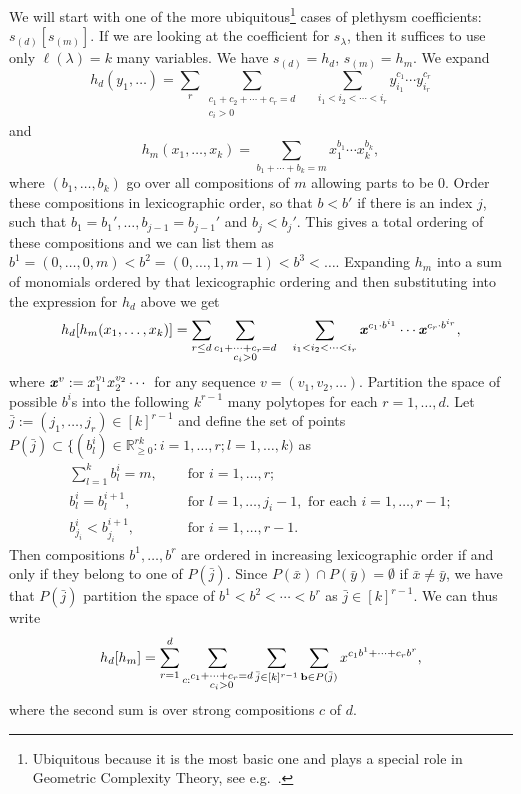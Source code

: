 \documentclass[11pt]{amsart}
\theoremstyle{plain}
\theoremstyle{definition}
\numberwithin{equation}{section}
\def\bx{{\textbf{\textit{x}}}}
\newcommand{\la}{\lambda}
\def\bbb{{\text{\bf b}}}
\def\la{\lambda}
\begin{document}
We will start with one of the more ubiquitous\footnote{Ubiquitous because it is the most basic one and plays a special role in Geometric Complexity Theory, see e.g.~\cite{IP17}.} cases of plethysm coefficients: $s_{(d)} [s_{(m)}]$. If we are looking at the coefficient for $s_\la$, then it suffices to use only $\ell(\la)=k$ many variables. We have $s_{(d)}=h_d$, $s_{(m)}=h_m$. We expand 
$$h_d(y_1,\ldots) = \sum_r \sum_{ \substack{ c_1+c_2+\cdots+c_r =d \\ c_i>0}} \quad \sum_{i_1<i_2<\cdots<i_r} y_{i_1}^{c_1}\cdots y_{i_r}^{c_r}$$
and 
$$h_m(x_1,\ldots,x_k) = \sum_{ b_1+\cdots+b_k=m} x_1^{b_1}\cdots x_k^{b_k},$$
where $(b_1,\ldots,b_k)$ go over all compositions of $m$ allowing parts to be 0. Order these compositions in lexicographic order, so that $b<b'$ if there is an index $j$, such that $b_1=b_1',\ldots,b_{j-1}=b_{j-1}'$ and $b_j<b_j'$. This gives a total ordering of these compositions and we can list them as $b^1=(0,\ldots,0,m)<b^2=(0,\ldots,1,m-1)<b^3<\ldots$.  Expanding $h_m$ into a sum of monomials ordered by that lexicographic ordering and then substituting into the expression for $h_d$ above we get
\begin{align}\label{eq:pleth_expansion}
h_d[h_m(x_1,\ldots,x_k)] = \sum_{r\leq d} \sum_{ \substack{ c_1+\cdots+c_r =d\\ c_i>0} } \quad \sum_{i_1<i_2<\cdots<i_r} \bx^{c_1\cdot b^{i_1}}\cdots \bx^{c_r \cdot b^{i_r}},
\end{align}
where $\bx^{v}:=x_1^{v_1} x_2^{v_2}\cdots$ for any sequence $v=(v_1,v_2,\ldots)$.
Partition the space of possible $b^i$s into the following $k^{r-1}$ many polytopes for each $r=1,\ldots,d$. Let $\bar{j}:=(j_1,\ldots,j_r) \in [k]^{r-1}$ and define the set of points $P(\bar{j}) \subset \{ (b_l^i) \in \mathbb{R}^{rk}_{\geq 0}: i=1,\ldots,r; l=1,\ldots,k)$ as 
\begin{align}
\sum_{l=1}^k b_l^i =m, & \quad \text{ for } i=1,\ldots,r;\\
b^i_l =b^{i+1}_l, & \quad\text{ for }l=1,\ldots,j_i-1, \text{ for each } i=1,\ldots,r-1; \\
b^i_{j_i} < b^{i+1}_{j_i},  & \quad \text{ for }i=1,\ldots,r-1.
\end{align}
Then compositions $b^1, \ldots, b^r$ are ordered in increasing lexicographic order if and only if they belong to one of $P(\bar{j})$. Since $P(\bar{x}) \cap P(\bar{y})=\emptyset$ if $\bar{x} \neq \bar{y}$, we have that $P(\bar{j})$ partition the space of $b^1<b^2<\cdots<b^r$ as $\bar{j} \in [k]^{r-1}$. 
We can thus write
$$
h_d[h_m] = \sum_{r=1}^d \sum_{c: \substack{ c_1+\cdots+c_r=d\\ c_i>0 }} \sum_{\bar{j} \in [k]^{r-1}} \sum_{\bbb \in P(\bar{j})}   x^{c_1b^1+\cdots+c_rb^r},
$$
where the second sum is over strong compositions $c$ of $d$. 
\end{document}
